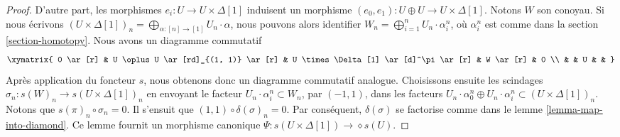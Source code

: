 \begin{proof}
\medskip\noindent
D'autre part, les morphismes $e_i : U \to U \times \Delta[1]$ induisent un
morphisme $(e_0, e_1) : U \oplus U \to U \times \Delta[1]$.
Notons $W$ son conoyau. Si nous écrivons
$(U \times \Delta[1])_n = \bigoplus_{\alpha : [n] \to [1]} U_n \cdot \alpha$,
nous pouvons alors identifier
$W_n = \bigoplus_{i = 1}^n U_n \cdot \alpha^n_i$, où
$\alpha^n_i$ est comme dans la section \ref{section-homotopy}.
Nous avons un diagramme commutatif
$$
\xymatrix{
0 \ar[r] &
U \oplus U \ar[rd]_{(1, 1)} \ar[r] &
U \times \Delta[1] \ar[d]^\pi \ar[r] &
W \ar[r] &
0 \\
& & U & &
}
$$
Après application du foncteur $s$, nous obtenons donc un diagramme
commutatif analogue. Choisissons ensuite les scindages
$\sigma_n : s(W)_n \to s(U \times \Delta[1])_n$ en envoyant le facteur
$U_n \cdot \alpha^n_i \subset W_n$, par $(-1, 1)$, dans les facteurs
$U_n \cdot \alpha^n_0 \oplus U_n \cdot \alpha^n_i
\subset (U \times \Delta[1])_n$. Notons que
$s(\pi)_n \circ \sigma_n = 0$. Il s'ensuit que
$(1, 1) \circ \delta(\sigma)_n = 0$. Par conséquent,
$\delta(\sigma)$ se factorise comme dans le
lemme \ref{lemma-map-into-diamond}. Ce lemme fournit un morphisme canonique
$\Psi : s(U \times \Delta[1]) \to \diamond{s(U)}$.


\end{proof}

